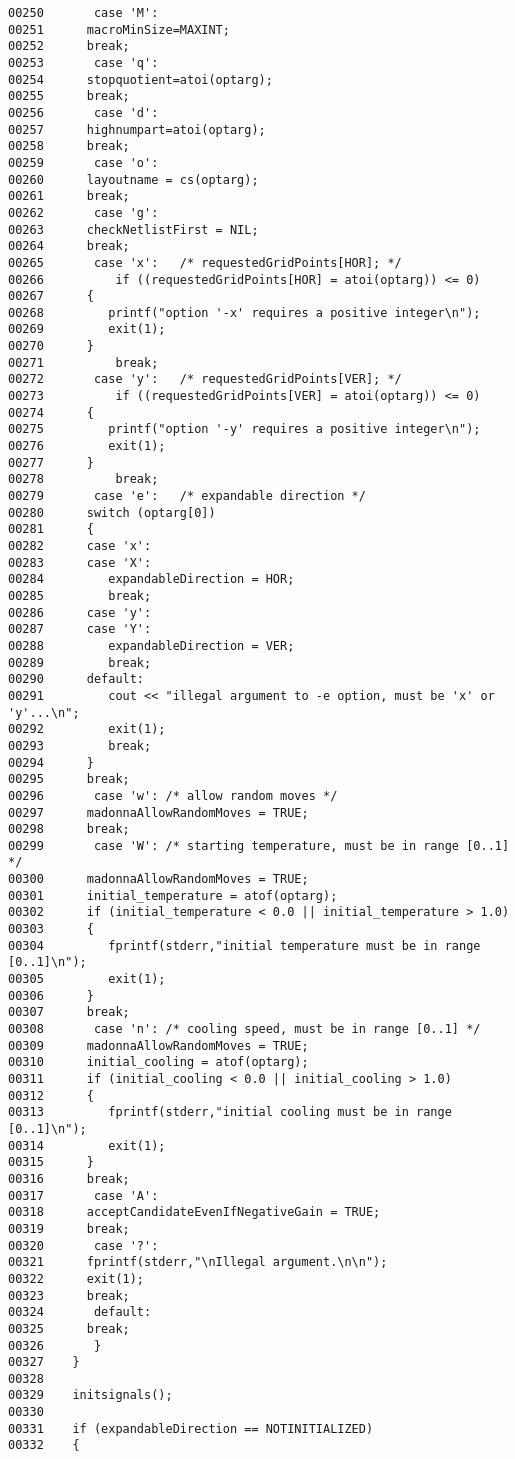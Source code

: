 \begin{verbatim}
00250       case 'M':
00251      macroMinSize=MAXINT;
00252      break;
00253       case 'q':
00254      stopquotient=atoi(optarg);
00255      break;
00256       case 'd':
00257      highnumpart=atoi(optarg);
00258      break;
00259       case 'o':
00260      layoutname = cs(optarg);
00261      break;
00262       case 'g':
00263      checkNetlistFirst = NIL;
00264      break;
00265       case 'x':   /* requestedGridPoints[HOR]; */
00266          if ((requestedGridPoints[HOR] = atoi(optarg)) <= 0)
00267      {
00268         printf("option '-x' requires a positive integer\n");
00269         exit(1);
00270      }
00271          break;
00272       case 'y':   /* requestedGridPoints[VER]; */
00273          if ((requestedGridPoints[VER] = atoi(optarg)) <= 0)
00274      {
00275         printf("option '-y' requires a positive integer\n");
00276         exit(1);
00277      }
00278          break;
00279       case 'e':   /* expandable direction */
00280      switch (optarg[0])
00281      {
00282      case 'x':
00283      case 'X':
00284         expandableDirection = HOR;
00285         break;
00286      case 'y':
00287      case 'Y':
00288         expandableDirection = VER;
00289         break;
00290      default:
00291         cout << "illegal argument to -e option, must be 'x' or 'y'...\n";
00292         exit(1);
00293         break;
00294      }
00295      break;
00296       case 'w': /* allow random moves */
00297      madonnaAllowRandomMoves = TRUE;
00298      break;
00299       case 'W': /* starting temperature, must be in range [0..1] */
00300      madonnaAllowRandomMoves = TRUE;
00301      initial_temperature = atof(optarg);
00302      if (initial_temperature < 0.0 || initial_temperature > 1.0)
00303      {
00304         fprintf(stderr,"initial temperature must be in range [0..1]\n");
00305         exit(1);
00306      }
00307      break;
00308       case 'n': /* cooling speed, must be in range [0..1] */
00309      madonnaAllowRandomMoves = TRUE;
00310      initial_cooling = atof(optarg);
00311      if (initial_cooling < 0.0 || initial_cooling > 1.0)
00312      {
00313         fprintf(stderr,"initial cooling must be in range [0..1]\n");
00314         exit(1);
00315      }
00316      break;
00317       case 'A':
00318      acceptCandidateEvenIfNegativeGain = TRUE;
00319      break;
00320       case '?':
00321      fprintf(stderr,"\nIllegal argument.\n\n");
00322      exit(1);
00323      break;
00324       default:
00325      break;
00326       }
00327    }
00328    
00329    initsignals();
00330 
00331    if (expandableDirection == NOTINITIALIZED)
00332    {

\end{verbatim}

